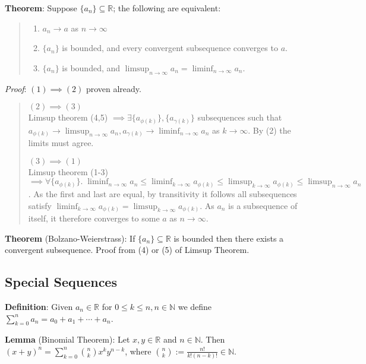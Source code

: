 \documentclass[11pt]{article}
\begin{document}
\textbf{Theorem}: Suppose $\{a_n\} \subseteq \mathbb{R}$; the following are equivalent:
\begin{quote}\vspace{-0.3cm}
	\begin{enumerate}
	\item $a_n \to a$ as $n \to \infty$
	\item $\{a_n\}$ is bounded, and every convergent subsequence converges to $a$.
	\item $\{a_n\}$ is bounded, and $\limsup_{n \to \infty} a_n = \liminf_{n \to \infty} a_n$.
	\end{enumerate}
\end{quote}
\emph{Proof}: $(1) \implies (2)$ proven already.
\begin{quote}\vspace{-0.3cm}
$(2) \implies (3)$\\
Limsup theorem (4,5) $\implies \exists \{a_{\phi(k)}\}, \{a_{\gamma(k)}\}$ subsequences such that $a_{\phi(k)} \to \limsup_{n \to \infty} a_n, a_{\gamma(k)} \to \liminf_{n \to \infty} a_n$ as $k \to \infty$. By (2) the limits must agree.

$(3) \implies (1)$\\
Limsup theorem (1-3) $\implies \forall \{a_{\phi(k)}\}.\; \liminf_{n \to \infty} a_n \leq \liminf_{k \to \infty} a_{\phi(k)} \leq \limsup_{k \to \infty} a_{\phi(k)} \leq \limsup_{n \to \infty} a_n$. As the first and last are equal, by transitivity it follows all subsequences satisfy $\liminf_{k \to \infty} a_{\phi(k)} = \limsup_{k \to \infty} a_{\phi(k)}$. As $a_n$ is a subsequence of itself, it therefore converges to some $a$ as $n \to \infty$.

\end{quote}

\textbf{Theorem} (Bolzano-Weierstrass): If $\{a_n\} \subseteq \mathbb{R}$ is bounded then there exists a convergent subsequence. Proof from (4) or (5) of Limsup Theorem.

\subsection{Special Sequences}

\textbf{Definition}: Given $a_n \in \mathbb{R}$ for $0 \leq k \leq n, n \in \mathbb{N}$ we define $\sum_{k=0}^n a_n = a_0 + a_1 + \cdots + a_n$.

\textbf{Lemma} (Binomial Theorem): Let $x,y \in \mathbb{R}$ and $n \in \mathbb{N}$. Then $(x+y)^n = \sum\limits_{k=0}^n {n \choose k} x^k y^{n-k}$, where ${n \choose k} := \frac{n!}{k!(n-k)!} \in \mathbb{N}$.
\end{document}
